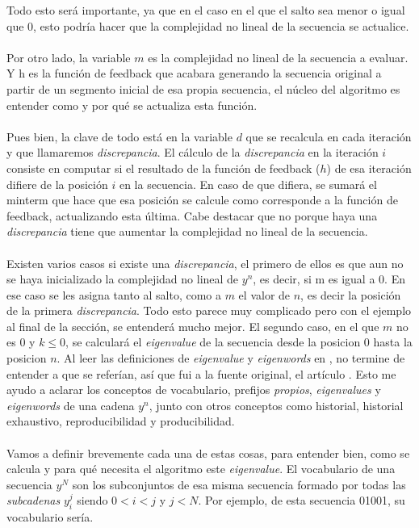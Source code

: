 \noindent Todo esto será importante, ya que en el caso en el que el salto sea menor o igual que 0, esto podría hacer que la complejidad no lineal de la secuencia se actualice.\\\\
Por otro lado, la variable $m$ es la complejidad no lineal de la secuencia a evaluar. Y h es la función de feedback que acabara generando la secuencia original a partir de un segmento inicial de esa propia secuencia, el núcleo del algoritmo es entender como y por qué se actualiza esta función.\\\\
Pues bien, la clave de todo está en la variable $d$ que se recalcula en cada iteración y que llamaremos \textit{discrepancia}. El cálculo de la \textit{discrepancia} en la iteración $i$ consiste en computar si el resultado de la función de feedback ($h$) de esa iteración difiere de la posición $i$ en la secuencia. En caso de que difiera, se sumará el minterm que hace que esa posición se calcule como corresponde a la función de feedback, actualizando esta última. Cabe destacar que no porque haya una \textit{discrepancia} tiene que aumentar la complejidad no lineal de la secuencia.\\\\
Existen varios casos si existe una \textit{discrepancia}, el primero de ellos es que aun no se haya inicializado la complejidad no lineal de $y^{n}$, es decir, si m es igual a 0. En ese caso se les asigna tanto al salto, como a $m$ el valor de $n$, es decir la posición de la primera \textit{discrepancia}. Todo esto parece muy complicado pero con el ejemplo al final de la sección, se entenderá mucho mejor. El segundo caso, en el que $m$ no es 0 y $k \leq 0$, se calculará el \textit{eigenvalue} de la secuencia desde la posicion 0 hasta la posicion $n$. Al leer las definiciones de  \textit{eigenvalue} y \textit{eigenwords} en \cite{limniotis2007nonlinear}, no termine de entender a que se referían, así que fui a la fuente original, el artículo \cite{lempel1976complexity}. Esto me ayudo a aclarar los conceptos de vocabulario, prefijos \textit{propios}, \textit{eigenvalues} y \textit{eigenwords} de una cadena $y^n$, junto con otros conceptos como historial, historial exhaustivo, reproducibilidad y producibilidad. \\\\
Vamos a definir brevemente cada una de estas cosas, para entender bien, como se calcula y para qué necesita el algoritmo este \textit{eigenvalue}. El vocabulario de una secuencia $y^{N}$ son los subconjuntos de esa misma secuencia formado por todas las \textit{subcadenas} $y_i^{j}$ siendo $0 < i < j$ y $j < N$. Por ejemplo, de esta secuencia 01001, su vocabulario sería.
